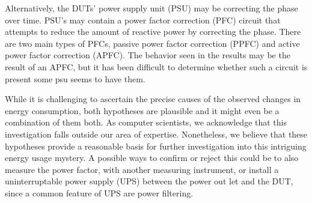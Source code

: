 Alternatively, the DUTs' power supply unit (PSU) may be correcting the phase over time. PSU's may contain a power factor correction (PFC) circuit that attempts to reduce the amount of reactive power by correcting the phase. There are two main types of PFCs, passive power factor correction (PPFC) and active power factor correction (APFC)\cite{mcdonald2020power}. The behavior seen in the results may be the result of an APFC, but it has been difficult to determine whether such a circuit is present some psu seems to have them\cite{TomPsuPFC}.

While it is challenging to ascertain the precise causes of the observed changes in energy consumption, both hypotheses are plausible and it might even be a combination of them both. As computer scientists, we acknowledge that this investigation falls outside our area of expertise. Nonetheless, we believe that these hypotheses provide a reasonable basis for further investigation into this intriguing energy usage mystery. A possible ways to confirm or reject this could be to also measure the power factor, with another measuring instrument, or install a uninterruptable power supply (UPS) between the power out let and the DUT, since a common feature of UPS are power filtering.